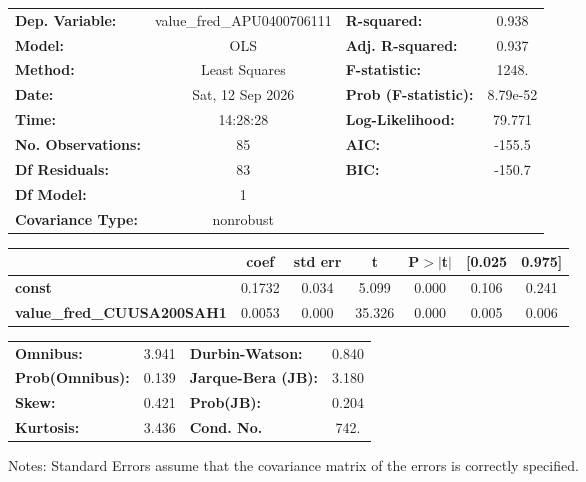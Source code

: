 \begin{center}
\begin{tabular}{lclc}
\toprule
\textbf{Dep. Variable:}            & value\_fred\_APU0400706111 & \textbf{  R-squared:         } &     0.938   \\
\textbf{Model:}                    &            OLS             & \textbf{  Adj. R-squared:    } &     0.937   \\
\textbf{Method:}                   &       Least Squares        & \textbf{  F-statistic:       } &     1248.   \\
\textbf{Date:}                     &      Sat, 12 Sep 2026      & \textbf{  Prob (F-statistic):} &  8.79e-52   \\
\textbf{Time:}                     &          14:28:28          & \textbf{  Log-Likelihood:    } &    79.771   \\
\textbf{No. Observations:}         &               85           & \textbf{  AIC:               } &    -155.5   \\
\textbf{Df Residuals:}             &               83           & \textbf{  BIC:               } &    -150.7   \\
\textbf{Df Model:}                 &                1           & \textbf{                     } &             \\
\textbf{Covariance Type:}          &         nonrobust          & \textbf{                     } &             \\
\bottomrule
\end{tabular}
\begin{tabular}{lcccccc}
                                   & \textbf{coef} & \textbf{std err} & \textbf{t} & \textbf{P$> |$t$|$} & \textbf{[0.025} & \textbf{0.975]}  \\
\midrule
\textbf{const}                     &       0.1732  &        0.034     &     5.099  &         0.000        &        0.106    &        0.241     \\
\textbf{value\_fred\_CUUSA200SAH1} &       0.0053  &        0.000     &    35.326  &         0.000        &        0.005    &        0.006     \\
\bottomrule
\end{tabular}
\begin{tabular}{lclc}
\textbf{Omnibus:}       &  3.941 & \textbf{  Durbin-Watson:     } &    0.840  \\
\textbf{Prob(Omnibus):} &  0.139 & \textbf{  Jarque-Bera (JB):  } &    3.180  \\
\textbf{Skew:}          &  0.421 & \textbf{  Prob(JB):          } &    0.204  \\
\textbf{Kurtosis:}      &  3.436 & \textbf{  Cond. No.          } &     742.  \\
\bottomrule
\end{tabular}
\end{center}

Notes: \newline
 [1] Standard Errors assume that the covariance matrix of the errors is correctly specified.